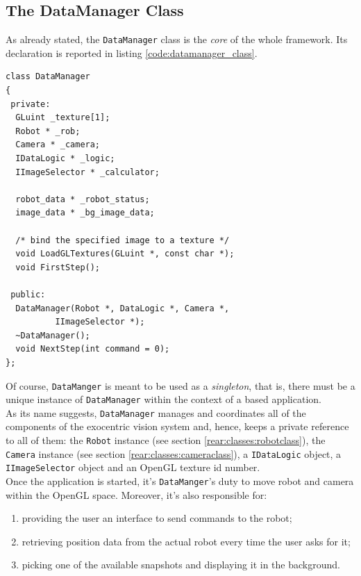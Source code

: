\subsection{The DataManager Class}
\label{rear:classes:datamanager}

As already stated, the \texttt{DataManager} class is the \textit{core}
of the whole framework. Its declaration is reported in 
listing \ref{code:datamanager_class}.
\\
\begin{lstlisting}[caption={\texttt{DataManager} class declaration}, label={code:datamanager_class}]
class DataManager
{
 private:
  GLuint _texture[1];
  Robot * _rob;
  Camera * _camera;
  IDataLogic * _logic;
  IImageSelector * _calculator;

  robot_data * _robot_status;
  image_data * _bg_image_data;

  /* bind the specified image to a texture */
  void LoadGLTextures(GLuint *, const char *);
  void FirstStep();

 public:
  DataManager(Robot *, DataLogic *, Camera *, 
	      IImageSelector *); 
  ~DataManager();
  void NextStep(int command = 0);
};
\end{lstlisting}

Of course, \texttt{DataManger} is meant to be used as a \textit{singleton}, 
that is, there must be a unique instance of \texttt{DataManager} 
within the context of a \framework{} based application.
\\
As its name suggests, \texttt{DataManager} manages and coordinates 
all of the components of the exocentric vision system and, hence, 
keeps a private reference to all of them: 
the \texttt{Robot} instance (see section \ref{rear:classes:robotclass}), the 
\texttt{Camera} instance (see section \ref{rear:classes:cameraclass}),
a \texttt{IDataLogic} object, a \texttt{IImageSelector} 
object and an OpenGL texture id number.
\\
Once the application is started, it's \texttt{DataManger}'s duty 
to move robot and camera within the OpenGL space. Moreover, 
it's also responsible for:

\begin{enumerate}
  \item providing the user an interface 
    to send commands to the robot;
  \item retrieving position 
    data from the actual robot every time the user asks 
    for it;
  \item picking one of the available snapshots and 
    displaying it in the background.
\end{enumerate}

